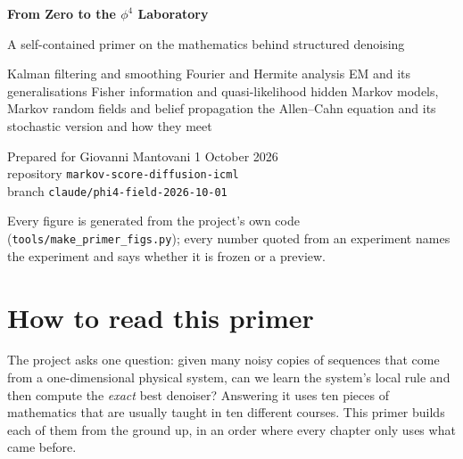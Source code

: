 \documentclass[10pt,a4paper]{article}
\theoremstyle{plain}
\theoremstyle{definition}
\newcommand{\code}[1]{\texttt{\small #1}}
\begin{document}
\begin{titlepage}
\vspace*{3cm}
{\Huge\bfseries From Zero to the $\phi^4$ Laboratory\par}
\vspace{0.6cm}
{\Large A self-contained primer on the mathematics behind structured denoising\par}
\vspace{1.2cm}
{\large Kalman filtering and smoothing \textperiodcentered{} Fourier and Hermite analysis \textperiodcentered{}
EM and its generalisations \textperiodcentered{} Fisher information and quasi-likelihood \textperiodcentered{}
hidden Markov models, Markov random fields and belief propagation \textperiodcentered{}
the Allen--Cahn equation and its stochastic version \textperiodcentered{} and how they meet\par}
\vfill
{\normalsize Prepared for Giovanni Mantovani \textperiodcentered{} 1 October 2026\\[0.2em]
repository \code{markov-score-diffusion-icml}\\ branch \code{claude/phi4-field-2026-10-01}\par}
\vspace{0.4cm}
{\small Every figure is generated from the project's own code (\code{tools/make\_primer\_figs.py});
every number quoted from an experiment names the experiment and says whether it is frozen or a preview.\par}
\end{titlepage}

\section*{How to read this primer}

The project asks one question: given many noisy copies of sequences that come from a
one-dimensional physical system, can we learn the system's local rule and then compute the
\emph{exact} best denoiser? Answering it uses ten pieces of mathematics that are usually
taught in ten different courses. This primer builds each of them from the ground up, in an
order where every chapter only uses what came before.
\end{document}
